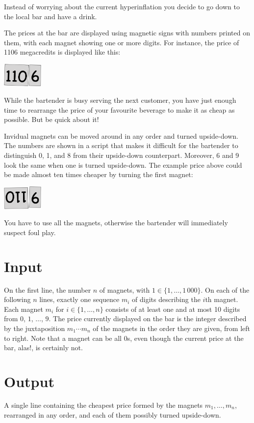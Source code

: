 

Instead of worrying about the current hyperinflation you decide to go down to the local bar and have a drink.

The prices at the bar are displayed using magnetic signs with numbers printed on them, with each magnet showing one or more digits.
For instance, the price of 1106 megacredits is displayed like this:

\medskip
\includegraphics[width = 2cm]{img/from.png}

While the bartender is busy serving the next customer, you have just enough time to rearrange the price of your favourite beverage to make it as cheap as possible.
But be quick about it!

Invidual magnets can be moved around in any order and turned upside-down.
The numbers are shown in a script that makes it difficult for the bartender to distinguish 0, 1, and 8 from their upside-down counterpart.
Moreover, 6 and 9 look the same when one is turned upside-down.
The example price above could be made almost ten times cheaper by turning the first magnet:

\medskip
\includegraphics[width = 2cm]{img/to.png}

You have to use all the magnets, otherwise the bartender will immediately suspect foul play.

\section*{Input}

On the first line, the number $n$ of magnets, with $1\in\{1,\ldots, 1\,000\}$.
On each of the following $n$ lines, exactly one sequence $m_i$ of digits describing the $i$th magnet.
Each magnet $m_i$ for $i\in \{1,\ldots, n\}$ consists of at least one and at most 10 digits from $0$, $1$, $\ldots$, $9$.
The price currently displayed on the bar is the integer described by the juxtaposition $m_1\cdots m_n$ of the magnets in the order they are given, from left to right.
Note that a magnet can be all $0$s, even though the current price at the bar, alas!, is certainly not.

\section*{Output}

A single line containing the cheapest price formed by the magnets $m_1,\ldots,m_n$, rearranged in any order, and each of them possibly turned upside-down.
